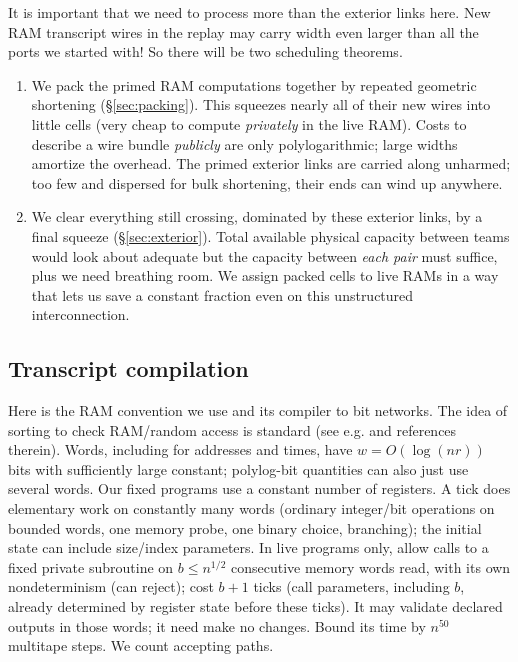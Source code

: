 \documentclass[11pt,letterpaper]{article}
\theoremstyle{definition}
\numberwithin{equation}{section}
\begin{document}


It is important that we need to process more than the exterior links here. New RAM
transcript wires in the replay may carry width even larger than all the ports we started
with! So there will be two scheduling theorems.

\begin{enumerate}
\item We pack the primed RAM computations together by repeated geometric shortening
(\S\ref{sec:packing}). This squeezes nearly all of their new wires into little cells (very cheap to
compute \emph{privately} in the live RAM). Costs to describe a wire bundle \emph{publicly} are only
polylogarithmic; large widths amortize the overhead. The primed exterior links are
carried along unharmed; too few and dispersed for bulk shortening, their ends can
wind up anywhere.
\item We clear everything still crossing, dominated by these exterior links, by a final squeeze
(\S\ref{sec:exterior}). Total available physical capacity between teams would look about adequate but
the capacity between \emph{each pair} must suffice, plus we need breathing room. We assign
packed cells to live RAMs in a way that lets us save a constant fraction even on this
unstructured interconnection.
\end{enumerate}

\subsection{Transcript compilation}

Here is the RAM convention we use and its compiler to bit networks. The idea of sorting to
check RAM/random access is standard (see e.g. \cite{BCGTV} and references therein). Words, including
for addresses and times, have $w=O(\log(nr))$ bits with sufficiently large constant; polylog-bit
quantities can also just use several words. Our fixed programs use a constant number of
registers. A tick does elementary work on constantly many words (ordinary integer/bit
operations on bounded words, one memory probe, one binary choice, branching); the initial
state can include size/index parameters. In live programs only, allow calls to a fixed private
subroutine on $b\le n^{1/2}$ consecutive memory words read, with its own nondeterminism (can
reject); cost $b+1$ ticks (call parameters, including $b$, already determined by register state
before these ticks). It may validate declared outputs in those words; it need make no changes.
Bound its time by $n^{50}$ multitape steps. We count accepting paths.
\end{document}
